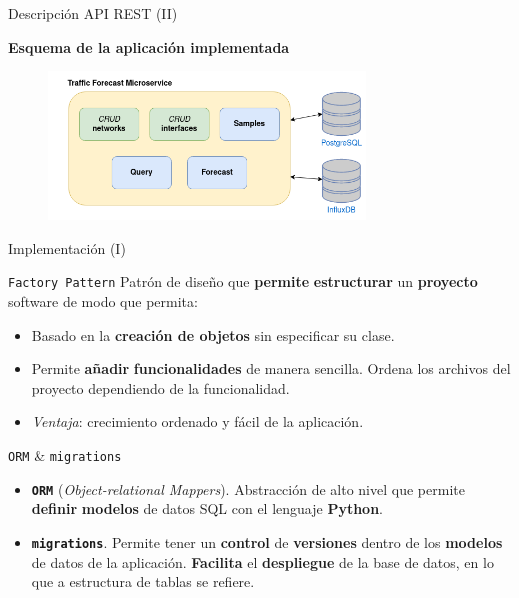 \documentclass[aspectratio=169,xcolor=dvipsnames]{beamer}
\begin{document}
	
	\begin{frame}{Descripción API REST (II)}
		
		\textbf{Esquema de la aplicación implementada}
		
		\begin{figure}[h!]
			\begin{center}
				\includegraphics[width=0.75\textwidth]{diag/traffic_forecast_schema.png}
			\end{center}
		\end{figure}
	\end{frame}
	
	
	\begin{frame}{Implementación (I)}
		\begin{exampleblock}{\texttt{Factory Pattern}}
			Patrón de diseño que \textbf{permite} \textbf{estructurar} un \textbf{proyecto} software de modo que permita:
			\begin{itemize}
				\item Basado en la \textbf{creación de objetos} sin especificar su clase.
				\item Permite \textbf{añadir} \textbf{funcionalidades} de manera sencilla. Ordena los archivos del proyecto dependiendo de la funcionalidad.
				\item \textit{Ventaja}: crecimiento ordenado y fácil de la aplicación.
			\end{itemize}
		\end{exampleblock}
	
		\begin{alertblock}{\texttt{ORM} \& \texttt{migrations}}
			\begin{itemize}
				\item \texttt{\textbf{ORM}} (\textit{Object-relational Mappers}). Abstracción de alto nivel que permite \textbf{definir} \textbf{modelos} de datos SQL con el lenguaje \textbf{Python}.
				
				\item \texttt{\textbf{migrations}}. Permite tener un \textbf{control} de \textbf{versiones} dentro de los \textbf{modelos} de datos de la aplicación. \textbf{Facilita} el \textbf{despliegue} de la base de datos, en lo que a estructura de tablas se refiere.	
		\end{itemize}
		\end{alertblock}
		
	\end{frame}
\end{document}
